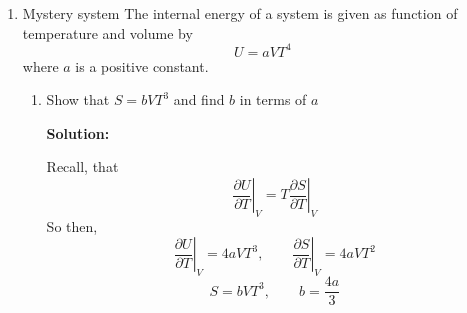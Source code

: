 \documentclass[10pt]{article}
\newenvironment{Solution}
    {\textbf{Solution:}
    
    \vspace{5mm}
    \begin{tcolorbox}
    }
    {
    \end{tcolorbox}
    \vspace{5mm}
    }
\begin{document}
\begin{enumerate}
\begin{enumerate}
\begin{Solution}
\begin{equation}
    \boxed{C_v = \frac{f}{2}Nk} \qquad \boxed{C_p = \frac{f}{2}Nk + Nk}
\end{equation}
so,
\begin{equation}
    \boxed{\gamma = \frac{C_p}{C_v}}
\end{equation}
\end{Solution}

\item Consider an (idealized) four stroke engine (Otto motor) working with an ideal gas as a working medium. The (idealized) cycle is given in the figure below:
Determine the efficiency $\eta=\Delta W / \Delta Q$ of this cycle, where $\Delta W$ is the performed work, and $\Delta Q$ is the generated heat during combustion. Express the efficiency in terms of the compression ratio $V_{3} / V_{4}$ of the engine and the degrees of freedom $f$ of the working gas.

\begin{Solution}
For the Otto cycle, efficiency is 
\begin{equation}
    \eta = 1 - \frac{1}{\frac{V_3}{V_4}^{\frac{{f}+{2}}{f}-1}}
\end{equation}

\end{Solution}
\end{enumerate}
\newpage




\item Mystery system The internal energy of a system is given as function of temperature and volume by
$$
U=a V T^{4}
$$
where $a$ is a positive constant.
\begin{enumerate}
\item Show that $S=b V T^{3}$ and find $b$ in terms of $a$

\begin{Solution}
Recall, that 
\begin{equation}
    \left.\frac{\partial U}{\partial T}\right|_V = T \left.\frac{\partial S}{\partial T}\right|_V
\end{equation}
So then, 
\begin{equation}
     \left.\frac{\partial U}{\partial T}\right|_V = 4aVT^3, \qquad \left.\frac{\partial S}{\partial T}\right|_V = 4aVT^2
\end{equation}
\begin{equation}
    \boxed{S = bVT^3, \qquad b = \frac{4a}{3}}
\end{equation}
\end{Solution}


\end{enumerate}
\end{enumerate}
\end{document}
